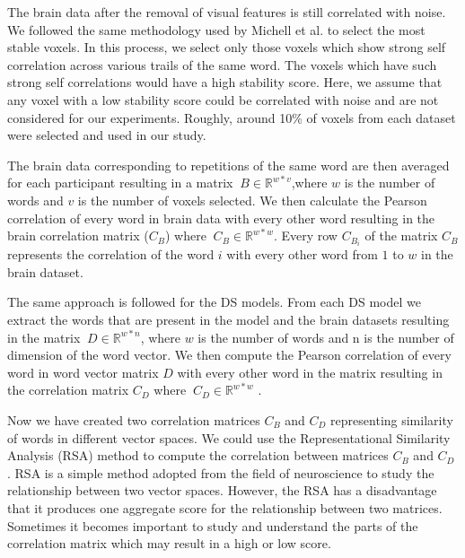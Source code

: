 The brain data after the removal of visual features is still correlated with noise. We followed the same methodology used by Michell et al. \cite{Mitchell1191} to select the most stable voxels. In this process, we select only those voxels which show strong self correlation across various trails of the same word. The voxels which have such strong self correlations would have a high stability score. Here, we assume that any voxel with a low stability score could be correlated with noise and are not considered for our experiments. Roughly, around 10\% of voxels from each dataset were selected and used in our study.

The brain data corresponding to repetitions of the same word are then averaged for each participant resulting in a matrix $\ B\in \mathbb{R} ^{w*v}$,where $w$ is the number of words and $v$ is the number of voxels selected. We then calculate the Pearson correlation of every word in brain data with every other word resulting in the brain correlation matrix ($C_B$) where $\ C_B\in \mathbb{R} ^{w*w}$. Every row $C_{B_i}$ of the matrix $C_B$ represents the correlation of the word $i$ with every other word from $1$ to $w$ in the brain dataset. 

The same approach is followed for the DS models. From each DS model we extract the words that are present in the model and the brain datasets resulting in the matrix $\ D\in \mathbb{R} ^{w*n}$, where $w$ is the number of words and n is the number of dimension of the word vector. We then compute the Pearson correlation of every word in word vector matrix $D$ with every other word in the matrix resulting in the correlation matrix $C_D$ where $\ C_D\in \mathbb{R} ^{w*w}$ .

Now we have created two correlation matrices $C_B$ and  $C_D$ representing similarity of words in different vector spaces. We could use the Representational Similarity Analysis (RSA) method to compute the correlation between matrices $C_B$ and  $C_D$ \cite{RSA}. RSA is a simple method adopted from the field of neuroscience to study the relationship between two vector spaces. However, the RSA has a disadvantage that it produces one aggregate score for the relationship between two matrices. Sometimes it becomes important to study and understand the parts of the correlation matrix which may result in a high or low score. 


